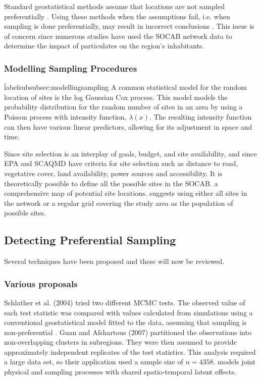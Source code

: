 \documentclass{article}
\begin{document}
Standard geostatistical methods assume that locations are not sampled preferentially \citep{diggle2010geostatistical}.  Using these methods when the assumptions fail, i.e. when sampling is done preferentially, may result in incorrect conclusions \citep{isaaks1988spatial}.  This issue is of concern since numerous studies have used the \ac{SOCAB} network data to determine the impact of particulates on the region's inhabitants.

\subsubsection*{Modelling Sampling Procedures}
\'label{subsubsec:modellingsampling}
A common statistical model for the random location of sites is the log Gaussian Cox process.  This model models the probability distribution for the random number of sites in an area by using a Poisson process with intensity function, $\lambda(x)$.  
The resulting intensity function can then have various linear predictors, allowing for its adjustment in space and time.

Since site selection is an interplay of goals, budget, and site availability, and since \ac{EPA} and \ac{SCAQMD} have criteria for site selection such as distance to road, vegetative cover, land availability, power sources and accessibility.  It is theoretically possible to define all the possible sites in the \ac{SOCAB}.  
a comprehensive map of potential site locations.  
\citet{watson2019} suggests using either all sites in the network or a regular grid covering the study area as the population of possible sites.  


\subsection{Detecting Preferential Sampling}
\label{subsec:prefsampdetection}
Several techniques have been proposed and these will now be reviewed.

\subsubsection*{Various proposals}
\label{subsubsec:various}
Schlather et al. (2004) tried two different MCMC tests.  The observed value of each test statistic was compared with values calculated from simulations using a conventional geostatistical model fitted to the data,  assuming that sampling is non-preferential \citep{schlather2004detecting}.  Guan and Afshartous (2007) partitioned the observations into non-overlapping clusters in subregions. They were then assumed to provide approximately independent replicates of the test statistics. This analysis required a large data set, so their application used a sample size of 
$ n = 4358 $.  
\cite{diggle10} models joint physical and sampling processes with shared spatio-temporal latent effects.
\end{document}
